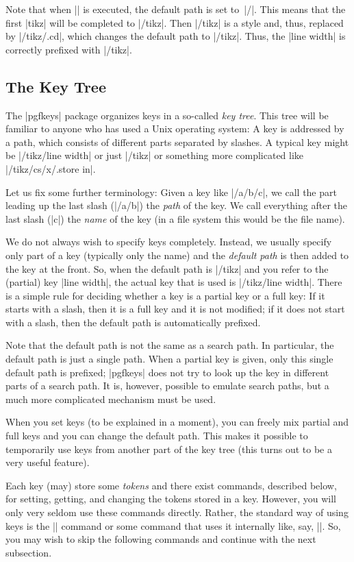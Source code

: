 Note that when |\pgfkeys| is executed, the default path is set
to~|/|. This means that the first |tikz| will be completed to
|/tikz|. Then |/tikz| is a style and, thus, replaced by |/tikz/.cd|,
which changes the default path to |/tikz|. Thus, the |line width| is
correctly prefixed with |/tikz|.

\subsection{The Key Tree}

The |pgfkeys| package organizes keys in a so-called \emph{key
  tree}. This tree will be familiar to anyone who has used a Unix
operating system: A key is addressed by a path, which consists of
different parts separated by slashes. A typical key might be
|/tikz/line width| or just |/tikz| or something more complicated like
|/tikz/cs/x/.store in|.

Let us fix some further terminology: Given a key like |/a/b/c|, we
call the part leading up the last slash (|/a/b|) the \emph{path} of
the key. We call everything after the last slash (|c|) the \emph{name}
of the key (in a file system this would be the file name).

We do not always wish to specify keys completely. Instead, we usually
specify only part of a key (typically only the name) and the
\emph{default path} is then added to the key at the front. So, when
the default path is |/tikz| and you
refer to the (partial) key |line width|, the actual key that is used
is |/tikz/line width|. There is a simple rule for deciding whether a
key is a partial key or a full key: If it starts with a slash, then it
is a full key and it is not modified; if it does not start with
a slash, then the default path is automatically prefixed.

Note that the default path is not the same as a search path. In
particular, the default path is just a single path. When a partial key
is given, only this single default path is prefixed; |pgfkeys| does
not try to look up the key in different parts of a search path. It is,
however, possible to emulate search paths, but a much more
complicated mechanism must be used.

When you set keys (to be explained in a moment), you can freely mix
partial and full keys and you can change the default path. This makes
it possible to temporarily use keys from another part of the key tree
(this turns out to be a very useful feature).

Each key (may) store some \emph{tokens} and there exist commands,
described below, for setting, getting, and changing the tokens stored
in a key. However, you will only very seldom use these commands
directly. Rather, the standard way of using keys is the |\pgfkeys|
command or some command that uses it internally like, say,
|\tikzset|. So, you may wish to skip the following commands and
continue with the next subsection.

